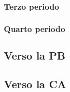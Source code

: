 \subsubsection{Terzo periodo}
\subsubsection{Quarto periodo}

\subsection{Verso la PB}

\subsection{Verso la CA}